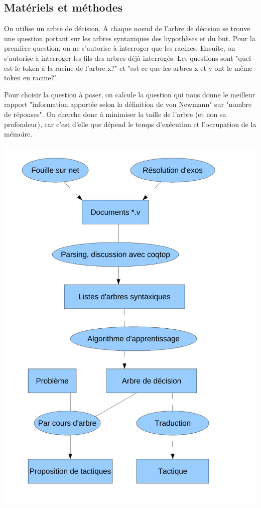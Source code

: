 \documentclass[a4paper,10pt]{article}
\begin{document}
\subsection{Matériels et méthodes}
On utilise un arbre de décision. A chaque noeud de l'arbre de décision se trouve une question portant sur les arbres syntaxiques des hypothèses et du but. Pour la première question, on ne s'autorise à interroger que les racines. Ensuite, on s'autorise à interroger les fils des arbres déjà interrogés. Les questions sont "quel est le token à la racine de l'arbre x?" et "est-ce que les arbres x et y ont le même token en racine?".

Pour choisir la question à poser, on calcule la question qui nous donne le meilleur rapport "information apportée selon la définition de von Newmann" sur "nombre de réponses". On cherche donc à minimiser la taille de l'arbre (et non sa profondeur), car c'est d'elle que dépend le temps d'exécution et l'occupation de la mémoire.

\includegraphics[scale=0.5]{organisation_apprentissage.pdf}
\end{document}
